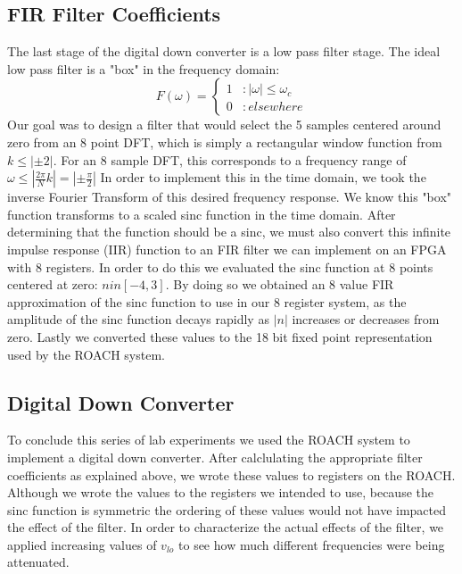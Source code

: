 \documentclass{article}
\begin{document}
  \subsection{FIR Filter Coefficients}
  The last stage of the digital down converter is a low pass filter stage.  The ideal low pass filter is a "box" in the frequency domain:
  \begin{displaymath}
   F(\omega) = \left\{
     \begin{array}{lr}
       1 & : |\omega| \le \omega_c\\
       0 & : elsewhere
     \end{array}
   \right.
  \end{displaymath}
  Our goal was to design a filter that would select the 5 samples centered around zero from an 8 point DFT, which is simply a rectangular window function from $k \le |\pm 2|$.  For an 8 sample DFT, this corresponds to a frequency range of $\omega \le |\frac{2\pi}{N}k| = |\pm \frac{\pi}{2}|$ In order to implement this in the time domain, we took the inverse Fourier Transform of this desired frequency response.  We know this "box" function transforms to a scaled sinc function in the time domain.
  After determining that the function should be a sinc, we must also convert this infinite impulse response (IIR) function to an FIR filter we can implement on an FPGA with 8 registers. In order to do this we evaluated the sinc function at 8 points centered at zero: $n in [-4,3]$. By doing so we obtained an 8 value FIR approximation of the sinc function to use in our 8 register system, as the amplitude of the sinc function decays rapidly as $|n|$ increases or decreases from zero. Lastly we converted these values to the 18 bit fixed point representation used by the ROACH system. 
  
  
  \subsection{Digital Down Converter}
  To conclude this series of lab experiments we used the ROACH system to implement a digital down converter. After calclulating the appropriate filter coefficients as explained above, we wrote these values to registers on the ROACH. Although we wrote the values to the registers we intended to use, because the sinc function is symmetric the ordering of these values would not have impacted the effect of the filter.  In order to characterize the actual effects of the filter, we applied increasing values of $v_{lo}$ to see how much different frequencies were being attenuated.
 
\end{document}
